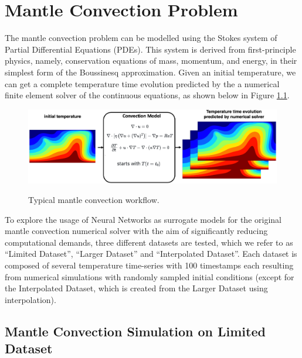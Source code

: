\chapter{Mantle Convection Problem}\label{chap:evaluation}

The mantle convection problem can be modelled using the Stokes system of Partial Differential Equations (PDEs).
This system is  derived from first-principle physics, namely, conservation equations of mass, momentum, and energy, in their simplest form of the Boussinesq approximation. Given an initial temperature, we can get a complete temperature time evolution predicted by the a numerical finite element solver of the continuous equations, as shown below in Figure \ref{figure:MC_workflow}.

\begin{figure}[H]
    \caption{Typical mantle convection workflow.}
    \includegraphics[scale=0.15]{figures/mantle_convection_images/Mantle_Convection_workflow.png}
    \label{figure:MC_workflow}
\end{figure}

To explore the usage of Neural Networks as surrogate models for the original mantle convection numerical solver with the aim of significantly reducing computational demands, three different datasets are tested, which we refer to as  ``Limited Dataset'', ``Larger Dataset'' and ``Interpolated Dataset''. Each dataset is composed of several temperature time-series with 100 timestamps each resulting from numerical simulations with randomly sampled initial conditions (except for the Interpolated Dataset, which is created from the Larger Dataset using interpolation).

\section{Mantle Convection Simulation on Limited Dataset}

